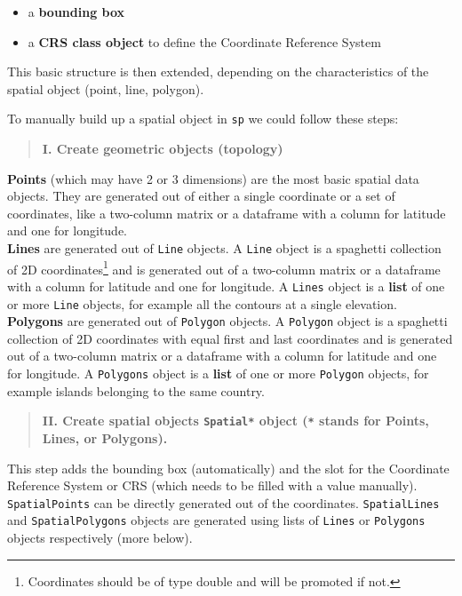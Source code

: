 \documentclass[]{book}
\let\rmarkdownfootnote\footnote%
\def\footnote{\protect\rmarkdownfootnote}
\begin{document}
\begin{itemize}
\item
  a \textbf{bounding box}
\item
  a \textbf{CRS class object} to define the Coordinate Reference System
\end{itemize}

This basic structure is then extended, depending on the characteristics
of the spatial object (point, line, polygon).

To manually build up a spatial object in \texttt{sp} we could follow
these steps:

\begin{quote}
\textbf{I. Create geometric objects (topology)}
\end{quote}

\textbf{Points} (which may have 2 or 3 dimensions) are the most basic
spatial data objects. They are generated out of either a single
coordinate or a set of coordinates, like a two-column matrix or a
dataframe with a column for latitude and one for longitude.\\
\textbf{Lines} are generated out of \texttt{Line} objects. A
\texttt{Line} object is a spaghetti collection of 2D
coordinates\footnote{Coordinates should be of type double and will be
  promoted if not.} and is generated out of a two-column matrix or a
dataframe with a column for latitude and one for longitude. A
\texttt{Lines} object is a \textbf{list} of one or more \texttt{Line}
objects, for example all the contours at a single elevation.\\
\textbf{Polygons} are generated out of \texttt{Polygon} objects. A
\texttt{Polygon} object is a spaghetti collection of 2D coordinates with
equal first and last coordinates and is generated out of a two-column
matrix or a dataframe with a column for latitude and one for longitude.
A \texttt{Polygons} object is a \textbf{list} of one or more
\texttt{Polygon} objects, for example islands belonging to the same
country.

\begin{quote}
\textbf{II. Create spatial objects \texttt{Spatial*} object (\texttt{*}
stands for Points, Lines, or Polygons).}
\end{quote}

This step adds the bounding box (automatically) and the slot for the
Coordinate Reference System or CRS (which needs to be filled with a
value manually). \texttt{SpatialPoints} can be directly generated out of
the coordinates. \texttt{SpatialLines} and \texttt{SpatialPolygons}
objects are generated using lists of \texttt{Lines} or \texttt{Polygons}
objects respectively (more below).
\end{document}

